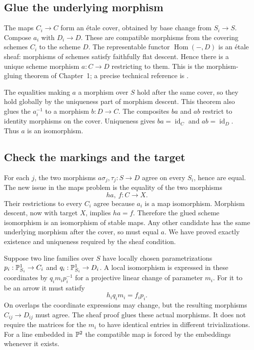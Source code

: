 \subsection{Glue the underlying morphism}

The maps $C_i\to C$ form an \'etale cover, obtained by base change from $S_i\to S$. Compose $a_i$ with $D_i\to D$. These are compatible morphisms from the covering schemes $C_i$ to the scheme $D$. The representable functor $\operatorname{Hom}(-,D)$ is an \'etale sheaf: morphisms of schemes satisfy faithfully flat descent. Hence there is a unique scheme morphism $a:C\to D$ restricting to them. This is the morphism-gluing theorem of Chapter~1; a precise technical reference is .

The equalities making $a$ a morphism over $S$ hold after the same cover, so they hold globally by the uniqueness part of morphism descent. This theorem also glues the $a_i^{-1}$ to a morphism $b:D\to C$. The composites $ba$ and $ab$ restrict to identity morphisms on the cover. Uniqueness gives $ba=\operatorname{id}_C$ and $ab=\operatorname{id}_D$. Thus $a$ is an isomorphism.

\subsection{Check the markings and the target}

For each $j$, the two morphisms $a\sigma_j,\tau_j:S\to D$ agree on every $S_i$, hence are equal. The new issue in the maps problem is the equality of the two morphisms
\[
 ha,\ f:C\longrightarrow X.
\]
Their restrictions to every $C_i$ agree because $a_i$ is a map isomorphism. Morphism descent, now with target $X$, implies $ha=f$. Therefore the glued scheme isomorphism is an isomorphism of stable maps. Any other candidate has the same underlying morphism after the cover, so must equal $a$. We have proved exactly existence and uniqueness required by the sheaf condition.

\begin{Ex}
Suppose two line families over $S$ have locally chosen parametrizations $p_i:\mathbb P^1_{S_i}\to C_i$ and $q_i:\mathbb P^1_{S_i}\to D_i$. A local isomorphism is expressed in these coordinates by $q_i m_i p_i^{-1}$ for a projective linear change of parameter $m_i$. For it to be an arrow it must satisfy
\[
 h_i q_i m_i=f_i p_i.
\]
On overlaps the coordinate expressions may change, but the resulting morphisms $C_{ij}\to D_{ij}$ must agree. The sheaf proof glues these actual morphisms. It does not require the matrices for the $m_i$ to have identical entries in different trivializations. For a line embedded in $\mathbb P^2$ the compatible map is forced by the embeddings whenever it exists.
\end{Ex}

